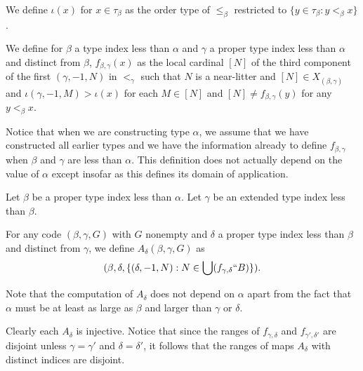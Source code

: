 \begin{definition}
\label {def:iota}
We define $\iota(x)$ for $x \in \tau_\beta$ as the order type of $\leq_\beta$ restricted to $\{y \in \tau_\beta:y <_\beta x\}$.
\end{definition}

\begin{definition}
\label {def:fmap}
We define for $\beta$ a type index less than $\alpha$ and $\gamma$ a proper type index less than $\alpha$ and distinct from $\beta$,   $f_{\beta,\gamma}(x)$ as the local cardinal $[N]$ of the third component of the first $(\gamma,-1,N)$ in $<_\gamma$ such that $N$ is a near-litter and $[N] \in X_{(\beta,\gamma)}$ and $\iota(\gamma,-1,M)>\iota(x)$ for each $M \in [N]$ and $[N] \neq f_{\beta,\gamma}(y)$ for any $y <_\beta x$.
\end{definition}

Notice that when we are constructing type $\alpha$, we assume that we have constructed all earlier types and we have the information already to define $f_{\beta,\gamma}$ when $\beta$ and $\gamma$ are less than $\alpha$.   This definition does not actually depend on the value of $\alpha$ except insofar as this defines its domain of application.

\begin{definition}
\label {def:alt-ext}
Let $\beta$ be a proper type index less than $\alpha$.  Let $\gamma$ be an extended type index less than $\beta$.

For any code $(\beta,\gamma,G)$ with $G$ nonempty and $\delta$ a proper type index less than $\beta$ and distinct from $\gamma$, we define
$A_\delta(\beta,\gamma,G)$ as $$(\beta,\delta,\{(\delta,-1,N):N \in \bigcup (f_{\gamma,\delta}``B)\}).$$

Note that the computation of $A_\delta$ does not depend on $\alpha$ apart from the fact that $\alpha$ must be at least as large as $\beta$ and larger than $\gamma$ or $\delta$.
\end{definition}

\begin{lemma}
\label {lem:alt-ext-nature}
Clearly each $A_\delta$ is injective.  Notice that since the ranges of $f_{\gamma,\delta}$ and $f_{\gamma',\delta'}$ are disjoint unless $\gamma=\gamma'$ and $\delta=\delta'$, it follows that the ranges of
maps $A_\delta$ with distinct indices are disjoint.
\end{lemma}

